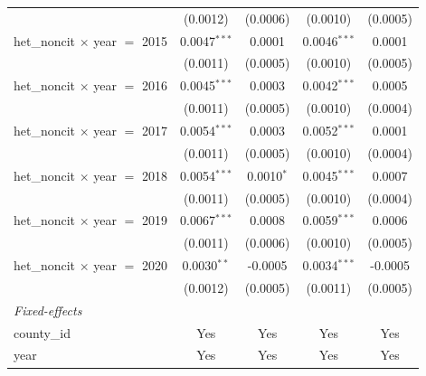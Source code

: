 \begin{tabular}{lcccc}
                                                    & (0.0012)           & (0.0006)                  & (0.0010)             & (0.0005)\\   
   het\_noncit $\times$ year $=$ 2015               & 0.0047$^{***}$     & 0.0001                    & 0.0046$^{***}$       & 0.0001\\   
                                                    & (0.0011)           & (0.0005)                  & (0.0010)             & (0.0005)\\   
   het\_noncit $\times$ year $=$ 2016               & 0.0045$^{***}$     & 0.0003                    & 0.0042$^{***}$       & 0.0005\\   
                                                    & (0.0011)           & (0.0005)                  & (0.0010)             & (0.0004)\\   
   het\_noncit $\times$ year $=$ 2017               & 0.0054$^{***}$     & 0.0003                    & 0.0052$^{***}$       & 0.0001\\   
                                                    & (0.0011)           & (0.0005)                  & (0.0010)             & (0.0004)\\   
   het\_noncit $\times$ year $=$ 2018               & 0.0054$^{***}$     & 0.0010$^{*}$              & 0.0045$^{***}$       & 0.0007\\   
                                                    & (0.0011)           & (0.0005)                  & (0.0010)             & (0.0004)\\   
   het\_noncit $\times$ year $=$ 2019               & 0.0067$^{***}$     & 0.0008                    & 0.0059$^{***}$       & 0.0006\\   
                                                    & (0.0011)           & (0.0006)                  & (0.0010)             & (0.0005)\\   
   het\_noncit $\times$ year $=$ 2020               & 0.0030$^{**}$      & -0.0005                   & 0.0034$^{***}$       & -0.0005\\   
                                                    & (0.0012)           & (0.0005)                  & (0.0011)             & (0.0005)\\   
   \midrule
   \emph{Fixed-effects}\\
   county\_id                                       & Yes                & Yes                       & Yes                  & Yes\\  
   year                                             & Yes                & Yes                       & Yes                  & Yes\\  

\end{tabular}
